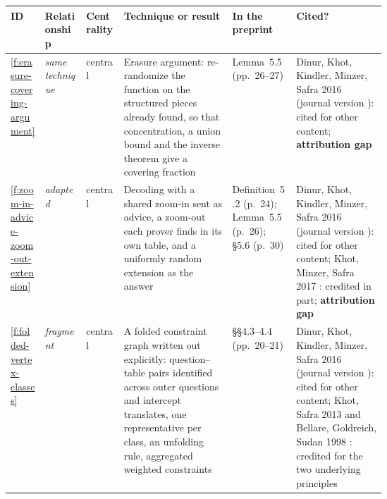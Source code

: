 \documentclass[11pt]{article}
\newcommand{\rel}[1]{\textit{#1}}
\newcommand{\attrgap}{\textbf{attribution gap}}
\newcommand{\overstated}{\textbf{overstated novelty}}
\newcounter{finding}
\begin{document}
\begin{center}\footnotesize
\begin{xltabular}{\linewidth}{@{}l >{\raggedright\arraybackslash}p{0.11\linewidth} >{\raggedright\arraybackslash}p{0.10\linewidth} >{\raggedright\arraybackslash}X >{\raggedright\arraybackslash}p{0.17\linewidth} >{\raggedright\arraybackslash}p{0.24\linewidth}@{}}
\toprule
ID & Relationship & Centrality & Technique or result & In the preprint & Cited?\\
\midrule
\endhead
\ref{f:erasure-covering-argument} & \rel{same technique} & central &
Erasure argument: re-randomize the function on the structured pieces already found, so that concentration, a union bound and the inverse theorem give a covering fraction &
Lemma~5.5 (pp.~26--27) &
Dinur, Khot, Kindler, Minzer, Safra 2016 \cite{DinurEtAl2016-Towards2to1-ECCC} (journal version \cite{DinurEtAl2018-Towards2to1}): cited for other content; \attrgap\\
\addlinespace
\ref{f:zoom-in-advice-zoom-out-extension} & \rel{adapted} & central &
Decoding with a shared zoom-in sent as advice, a zoom-out each prover finds in its own table, and a uniformly random extension as the answer &
Definition~5.2 (p.~24); Lemma~5.5 (p.~26); \S5.6 (p.~30) &
Dinur, Khot, Kindler, Minzer, Safra 2016 \cite{DinurEtAl2016-Towards2to1-ECCC} (journal version \cite{DinurEtAl2018-Towards2to1}): cited for other content; Khot, Minzer, Safra 2017 \cite{KhotMinzerSafra2017-IndependentSets2to2Grassmann}: credited in part; \attrgap\\
\addlinespace
\ref{f:folded-vertex-classes} & \rel{fragment} & central &
A folded constraint graph written out explicitly: question--table pairs identified across outer questions and intercept translates, one representative per class, an unfolding rule, aggregated weighted constraints &
\S\S4.3--4.4 (pp.~20--21) &
Dinur, Khot, Kindler, Minzer, Safra 2016 \cite{DinurEtAl2016-Towards2to1-ECCC} (journal version \cite{DinurEtAl2018-Towards2to1}): cited for other content; Khot, Safra 2013 \cite{KhotSafra2013-TwoProverStrongSoundness} and Bellare, Goldreich, Sudan 1998 \cite{BellareGoldreichSudan1998-FreeBitsPCPs}: credited for the two underlying principles\\

\end{xltabular}
\end{center}
\end{document}

